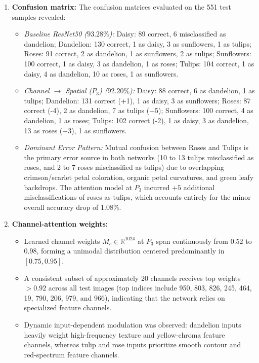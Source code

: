 \documentclass[10pt]{article}
\begin{document}
\begin{enumerate}
\item \textbf{Confusion matrix:}
The confusion matrices evaluated on the 551 test samples revealed:
\begin{itemize}
\item \textit{Baseline ResNet50 ($93.28\%$):} Daisy: 89 correct, 6 misclassified as dandelion; Dandelion: 130 correct, 1 as daisy, 3 as sunflowers, 1 as tulips; Roses: 91 correct, 2 as dandelion, 1 as sunflowers, 2 as tulips; Sunflowers: 100 correct, 1 as daisy, 3 as dandelion, 1 as roses; Tulips: 104 correct, 1 as daisy, 4 as dandelion, 10 as roses, 1 as sunflowers.
\item \textit{Channel $\rightarrow$ Spatial ($P_3$) ($92.20\%$):} Daisy: 88 correct, 6 as dandelion, 1 as tulips; Dandelion: 131 correct (+1), 1 as daisy, 3 as sunflowers; Roses: 87 correct (-4), 2 as dandelion, 7 as tulips (+5); Sunflowers: 100 correct, 4 as dandelion, 1 as roses; Tulips: 102 correct (-2), 1 as daisy, 3 as dandelion, 13 as roses (+3), 1 as sunflowers.
\item \textit{Dominant Error Pattern:} Mutual confusion between Roses and Tulips is the primary error source in both networks (10 to 13 tulips misclassified as roses, and 2 to 7 roses misclassified as tulips) due to overlapping crimson/scarlet petal coloration, organic petal curvatures, and green leafy backdrops. The attention model at $P_3$ incurred $+5$ additional misclassifications of roses as tulips, which accounts entirely for the minor overall accuracy drop of 1.08\%.
\end{itemize}

\item \textbf{Channel-attention weights:}
\begin{itemize}
\item Learned channel weights $M_c \in \mathbb{R}^{1024}$ at $P_3$ span continuously from $0.52$ to $0.98$, forming a unimodal distribution centered predominantly in $[0.75, 0.95]$.
\item A consistent subset of approximately 20 channels receives top weights $>0.92$ across all test images (top indices include 950, 803, 826, 245, 464, 19, 790, 206, 979, and 966), indicating that the network relies on specialized feature channels.
\item Dynamic input-dependent modulation was observed: dandelion inputs heavily weight high-frequency texture and yellow-chroma feature channels, whereas tulip and rose inputs prioritize smooth contour and red-spectrum feature channels.
\end{itemize}


\end{enumerate}
\end{document}
